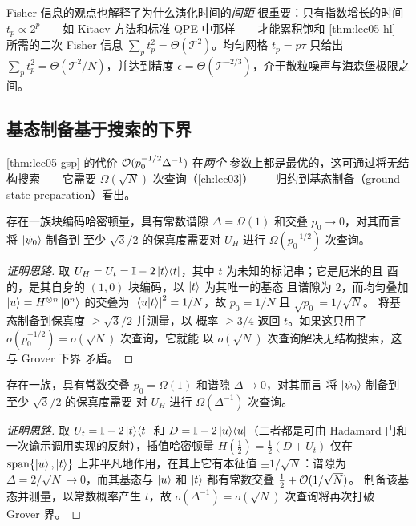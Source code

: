 Fisher 信息的观点也解释了为什么演化时间的\emph{间距}
很重要：只有指数增长的时间 $t_p\propto2^{p}$——如 Kitaev
方法和标准 QPE 中那样——才能累积饱和
\cref{thm:lec05-hl} 所需的二次 Fisher 信息
$\sum_p t_p^2=\Theta(\mathcal T^2)$。均匀网格 $t_p=p\tau$ 只给出
$\sum_p t_p^2=\Theta(\mathcal T^{2}/N)$，并达到精度
$\epsilon=\Theta(\mathcal T^{-2/3})$，介于散粒噪声与海森堡极限之间。

\subsection*{基态制备基于搜索的下界}

\cref{thm:lec05-gsp} 的代价 $\mathcal{O}(p_0^{-1/2}\Delta^{-1})$ 在\emph{两个}
参数上都是最优的，这可通过将无结构搜索——它需要
$\Omega(\sqrt N)$ 次查询（\cref{ch:lec03}）——归约到基态制备（ground-state preparation）看出。

\begin{theorem}[交叠下界]
\label{thm:lec05-lbp0}
存在一族块编码哈密顿量，具有常数谱隙
$\Delta=\Omega(1)$ 和交叠 $p_0\to0$，对其而言将 $\ket{\psi_0}$ 制备到
至少 $\sqrt3/2$ 的保真度需要对 $U_H$ 进行 $\Omega(p_0^{-1/2})$ 次查询。
\end{theorem}

\begin{proof}[证明思路]
取 $U_H=U_t=\mathbb{I}-2\ket{t}\!\bra{t}$，其中 $t$ 为未知的标记串；它是厄米的且
酉的，是其自身的 $(1,0)$ 块编码，以 $\ket{t}$ 为其唯一的基态
且谱隙为 $2$，而均匀叠加 $\ket{u}=H^{\otimes n}\ket{0^n}$
的交叠为 $\left\lvert \braket{u|t} \right\rvert^2=1/N$，故 $p_0=1/N$ 且 $\sqrt{p_0}=1/\sqrt N$。
将基态制备到保真度 $\ge\sqrt3/2$ 并测量，以
概率 $\ge3/4$ 返回 $t$。如果这只用了 $o(p_0^{-1/2})=o(\sqrt N)$ 次查询，它就能
以 $o(\sqrt N)$ 次查询解决无结构搜索，这与 Grover 下界
矛盾。
\end{proof}

\begin{theorem}[谱隙下界]
\label{thm:lec05-lbgap}
存在一族，具有常数交叠 $p_0=\Omega(1)$ 和谱隙 $\Delta\to0$，对其而言
将 $\ket{\psi_0}$ 制备到至少 $\sqrt3/2$ 的保真度需要
对 $U_H$ 进行 $\Omega(\Delta^{-1})$ 次查询。
\end{theorem}

\begin{proof}[证明思路]
取 $U_t=\mathbb{I}-2\ket{t}\!\bra{t}$ 和 $D=\mathbb{I}-2\ket{u}\!\bra{u}$（二者都是可由
Hadamard 门和一次谕示调用实现的反射），插值哈密顿量
$H(\tfrac12)=\tfrac12(D+U_t)$ 仅在
$\operatorname{span}\{\ket{u},\ket{t}\}$ 上非平凡地作用，在其上它有本征值
$\pm1/\sqrt N$：谱隙为 $\Delta=2/\sqrt N\to0$，而其基态与 $\ket{u}$ 和 $\ket{t}$
都有常数交叠 $\tfrac12+\mathcal{O}(1/\sqrt N)$。
制备该基态并测量，以常数概率产生 $t$，故
$o(\Delta^{-1})=o(\sqrt N)$ 次查询将再次打破 Grover 界。
\end{proof}

